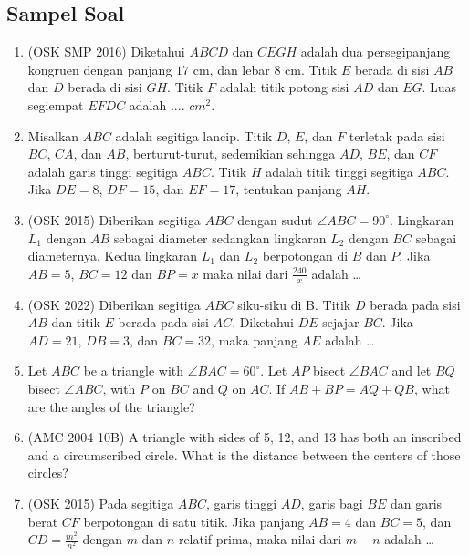 \documentclass[12pt]{scrartcl}
\begin{document}
\subsection{Sampel Soal}
\begin{enumerate}
    \item (OSK SMP 2016) Diketahui $ABCD$ dan $CEGH$ adalah dua persegipanjang kongruen dengan panjang $17$ cm, dan lebar $8$ cm. Titik $E$ berada di sisi $AB$ dan $D$ berada di sisi $GH$. Titik $F$ adalah titik potong sisi $AD$ dan $EG$. Luas segiempat $EFDC$ adalah .... $cm^2$.

    \item Misalkan $ABC$ adalah segitiga lancip. Titik $D$, $E$, dan $F$ terletak pada sisi $BC$, $CA$, dan $AB$, berturut-turut, sedemikian sehingga $AD$, $BE$, dan $CF$ adalah garis tinggi segitiga $ABC$. Titik $H$ adalah titik tinggi segitiga $ABC$. Jika $DE = 8$, $DF = 15$, dan $EF = 17$, tentukan panjang $AH$.

    \item (OSK 2015) Diberikan segitiga $ABC$ dengan sudut $\angle ABC = 90^\circ$. Lingkaran $L_1$ dengan $AB$ sebagai diameter sedangkan lingkaran $L_2$ dengan $BC$ sebagai diameternya. Kedua lingkaran $L_1$ dan $L_2$ berpotongan di $B$ dan $P$. Jika $AB = 5$, $BC = 12$ dan $BP = x$ maka nilai dari $\frac{240}{x}$ adalah \ldots

    \item (OSK 2022) Diberikan segitiga $ABC$ siku-siku di B. Titik $D$ berada pada sisi $AB$ dan titik $E$ berada pada sisi $AC$. Diketahui $DE$ sejajar $BC$. Jika $AD = 21$, $DB = 3$, dan $BC = 32$, maka panjang $AE$ adalah \dots
    
    \item Let $ABC$ be a triangle with $\angle BAC = 60^\circ$. Let $AP$ bisect $\angle BAC$ and let $BQ$ bisect $\angle ABC$, with $P$ on $BC$ and $Q$ on $AC$. If $AB + BP = AQ + QB$, what are the angles of the triangle?

    \item (AMC 2004 10B) A triangle with sides of 5, 12, and 13 has both an inscribed and a circumscribed circle. What is the distance between the centers of those circles?

    \item (OSK 2015) Pada segitiga $ABC$, garis tinggi $AD$, garis bagi $BE$ dan garis berat $CF$ berpotongan di satu titik. Jika panjang $AB = 4$ dan $BC = 5$, dan $CD = \frac{m^2}{n^2}$ dengan $m$ dan $n$ relatif prima, maka nilai dari $m - n$ adalah \ldots


\end{enumerate}
\end{document}

